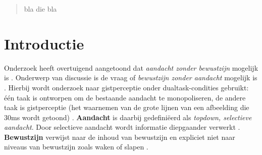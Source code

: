 \documentclass[a0,portrait]{a0poster}
\begin{document}

\begin{multicols}{3} %


\color{Navy} %

\begin{abstract}
bla die bla
\end{abstract}

\color{Black} %
\section*{Introductie}
Onderzoek heeft overtuigend aangetoond dat \textit{aandacht zonder bewustzijn} mogelijk is \cite{Jiang_Costello_Fang_Huang_He_2006, Sklar_Levy_Goldstein_Mandel_Maril_Hassin_2012, Cohen_Cavanagh_Chun_Nakayama_2012, Reddy_Reddy_Koch_2006, Li_VanRullen_Koch_Perona_2002}. Onderwerp van discussie is de vraag of \textit{bewustzijn zonder aandacht} mogelijk is \cite{Cohen_Cavanagh_Chun_Nakayama_2012,Mack_Clarke_2012, Jennings_2015, Block_2011}. Hierbij wordt onderzoek naar gistperceptie onder dualtask-condities gebruikt: \'{e}\'{e}n taak is ontworpen om de bestaande aandacht te monopoliseren, de andere taak is gistperceptie (het waarnemen van de grote lijnen van een afbeelding die 30ms wordt getoond) \cite{Mack_Clarke_2012}.
\textbf{Aandacht} is daarbij gedefini\"eerd als  \textit{topdown, selectieve aandacht}. Door selectieve aandacht wordt informatie diepgaander verwerkt \cite{Cohen_Cavanagh_Chun_Nakayama_2012}. 
\textbf{Bewustzijn} verwijst naar de inhoud van bewustzijn en expliciet niet naar niveaus van bewustzijn zoals waken of slapen \cite{VanBoxtel_Tsuchiya_Koch_2010}.  

\color{Black} %


\end{multicols}
\end{document}
